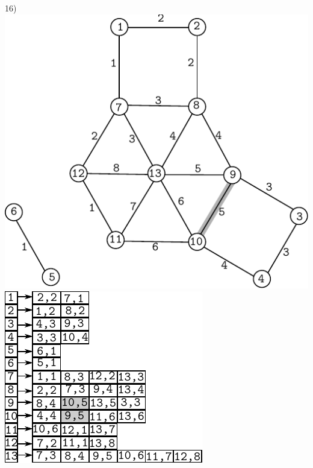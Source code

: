 \documentclass{article}
\begin{document}
\begin{center}
16)\includegraphics[scale=0.6]{bottleneck/g16}
\hspace{5mm}
\includegraphics[scale=0.9]{bottleneck/l16}
\end{center}
\end{document}
